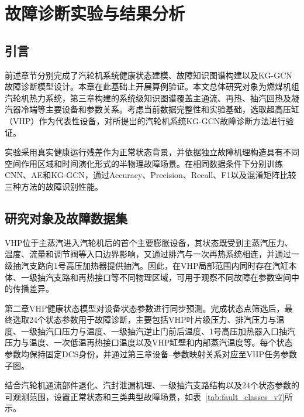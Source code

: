 \section{故障诊断实验与结果分析}
\label{sec:experiments_v7}

\subsection{引言}

前述章节分别完成了汽轮机系统健康状态建模、故障知识图谱构建以及KG-GCN故障诊断模型设计。本章在此基础上开展算例验证。本文总体研究对象为燃煤机组汽轮机热力系统，第三章构建的系统级知识图谱覆盖主通流、再热、抽汽回热及凝汽器冷端等主要设备和参数关系。考虑当前数据完整性和实验基础，选取超高压缸（VHP）作为代表性设备，对所提出的汽轮机系统KG-GCN故障诊断方法进行验证。

实验采用真实健康运行残差作为正常状态背景，并依据独立故障机理构造具有不同空间作用区域和时间演化形式的半物理故障场景。在相同数据条件下分别训练CNN、AE和KG-GCN，通过Accuracy、Precision、Recall、F1以及混淆矩阵比较三种方法的故障识别性能。

\subsection{研究对象及故障数据集}
\label{subsec:fault_dataset_v7}

VHP位于主蒸汽进入汽轮机后的首个主要膨胀设备，其状态既受到主蒸汽压力、温度、流量和调节阀等入口边界影响，又通过排汽与一次再热系统相连，并通过一级抽汽支路向1号高压加热器提供抽汽。因此，在VHP局部范围内同时存在汽缸本体、一级抽汽支路和再热接口等不同物理区域，可用于观察不同故障在参数空间中的传播差异。

第二章VHP健康状态模型对设备状态参数进行同步预测。完成状态点筛选后，最终选取24个状态参数用于故障诊断，主要包括VHP叶片级压力、排汽压力与温度、一级抽汽口压力与温度、一级抽汽逆止门前后温度、1号高压加热器入口抽汽压力与温度、一次低温再热接口温度以及VHP缸壁和内部蒸汽温度等。每个状态参数均保持固定DCS身份，并通过第三章设备--参数映射关系对应至VHP任务参数子图。

结合汽轮机通流部件退化、汽封泄漏机理、一级抽汽支路结构以及24个状态参数的可观测范围，设置正常状态和三类典型故障场景，如表~\ref{tab:fault_classes_v7}所示。

